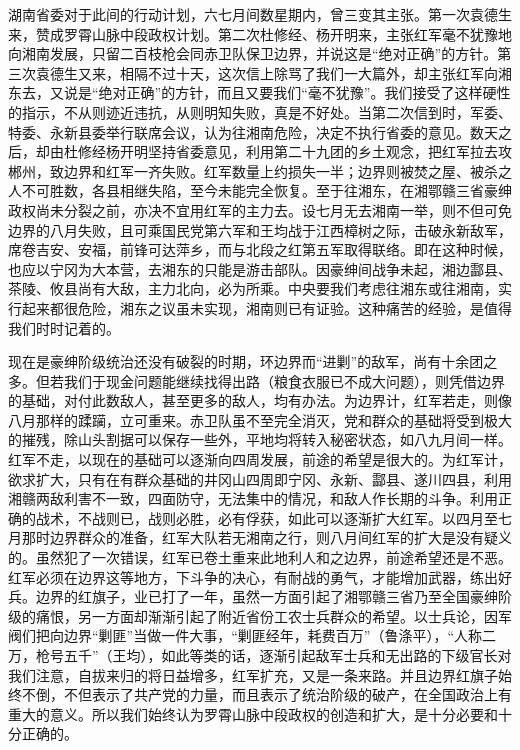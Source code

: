 湖南省委对于此间的行动计划，六七月间数星期内，曾三变其主张。第一次袁德生来，赞成罗霄山脉中段政权计划。第二次杜修经、杨开明来，主张红军毫不犹豫地向湘南发展，只留二百枝枪会同赤卫队保卫边界，并说这是“绝对正确”的方针。第三次袁德生又来，相隔不过十天，这次信上除骂了我们一大篇外，却主张红军向湘东去，又说是“绝对正确”的方针，而且又要我们“毫不犹豫”。我们接受了这样硬性的指示，不从则迹近违抗，从则明知失败，真是不好处。当第二次信到时，军委、特委、永新县委举行联席会议，认为往湘南危险，决定不执行省委的意见。数天之后，却由杜修经杨开明坚持省委意见，利用第二十九团的乡土观念，把红军拉去攻郴州，致边界和红军一齐失败。红军数量上约损失一半；边界则被焚之屋、被杀之人不可胜数，各县相继失陷，至今未能完全恢复。至于往湘东，在湘鄂赣三省豪绅政权尚未分裂之前，亦决不宜用红军的主力去。设七月无去湘南一举，则不但可免边界的八月失败，且可乘国民党第六军和王均战于江西樟树之际，击破永新敌军，席卷吉安、安福，前锋可达萍乡，而与北段之红第五军取得联络。即在这种时候，也应以宁冈为大本营，去湘东的只能是游击部队。因豪绅间战争未起，湘边酃县、茶陵、攸县尚有大敌，主力北向，必为所乘。中央要我们考虑往湘东或往湘南，实行起来都很危险，湘东之议虽未实现，湘南则已有证验。这种痛苦的经验，是值得我们时时记着的。

现在是豪绅阶级统治还没有破裂的时期，环边界而“进剿”的敌军，尚有十余团之多。但若我们于现金问题能继续找得出路（粮食衣服已不成大问题），则凭借边界的基础，对付此数敌人，甚至更多的敌人，均有办法。为边界计，红军若走，则像八月那样的蹂躏，立可重来。赤卫队虽不至完全消灭，党和群众的基础将受到极大的摧残，除山头割据可以保存一些外，平地均将转入秘密状态，如八九月间一样。红军不走，以现在的基础可以逐渐向四周发展，前途的希望是很大的。为红军计，欲求扩大，只有在有群众基础的井冈山四周即宁冈、永新、酃县、遂川四县，利用湘赣两敌利害不一致，四面防守，无法集中的情况，和敌人作长期的斗争。利用正确的战术，不战则已，战则必胜，必有俘获，如此可以逐渐扩大红军。以四月至七月那时边界群众的准备，红军大队若无湘南之行，则八月间红军的扩大是没有疑义的。虽然犯了一次错误，红军已卷土重来此地利人和之边界，前途希望还是不恶。红军必须在边界这等地方，下斗争的决心，有耐战的勇气，才能增加武器，练出好兵。边界的红旗子，业已打了一年，虽然一方面引起了湘鄂赣三省乃至全国豪绅阶级的痛恨，另一方面却渐渐引起了附近省份工农士兵群众的希望。以士兵论，因军阀们把向边界“剿匪”当做一件大事，“剿匪经年，耗费百万”（鲁涤平），“人称二万，枪号五千”（王均），如此等类的话，逐渐引起敌军士兵和无出路的下级官长对我们注意，自拔来归的将日益增多，红军扩充，又是一条来路。并且边界红旗子始终不倒，不但表示了共产党的力量，而且表示了统治阶级的破产，在全国政治上有重大的意义。所以我们始终认为罗霄山脉中段政权的创造和扩大，是十分必要和十分正确的。


